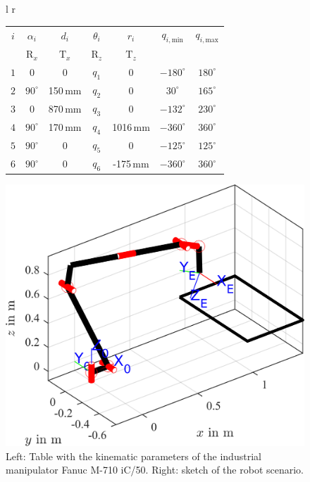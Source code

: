 \documentclass[robotics,article,submit,moreauthors,pdftex]{Definitions/mdpi}
\begin{document}
\begin{figure}[tb]
\begin{tabular}[t]{l r}
		\begin{tabular}[t]{|c|c|c|c|c|c|c|}
			\hline
			$i$ & $\alpha_i$ & $d_i$ & $\theta_i$ & $r_i$ & $q_{i,\mathrm{min}}$ & $q_{i,\mathrm{max}}$ \\
			& $\mathrm{R}_x$ & $\mathrm{T}_x$ & $\mathrm{R}_z$ & $\mathrm{T}_z$ & & \\
			\hline
			$1$ & $0$ & $0$ & $q_1$ & $0$ & $-180^\circ$ & $180^\circ$ \\
			$2$ & $90^\circ$ & 150\,mm & $q_2$ & $0$ & $30^\circ$ & $165^\circ$ \\
			$3$ & $0$ & 870\,mm & $q_3$ & $0$ & $-132^\circ$ & $230^\circ$ \\
			$4$ & $90^\circ$ & 170\,mm & $q_4$ & 1016\,mm & $-360^\circ$ & $360^\circ$ \\
			$5$ & $90^\circ$ & $0$ & $q_5$ & $0$ & $-125^\circ$ & $125^\circ$ \\
			$6$ & $90^\circ$ & $0$ & $q_6$ & -175\,mm & $-360^\circ$ & $360^\circ$ \\
			\hline
		\end{tabular}
    \begin{minipage}[t]{7.5cm}
    	\vspace{0.001cm} %
    	\hspace{1cm}
		\includegraphics[trim=30 30 0 30, clip, scale=0.7]{serrob_traj_zero_pose.png} %
    \end{minipage}
\end{tabular}
\caption{Left: Table with the kinematic parameters of the industrial manipulator Fanuc M-710 iC/50. Right: sketch of the robot scenario.}
\label{tab:mdh_industrialrobot}
\end{figure}
\end{document}
